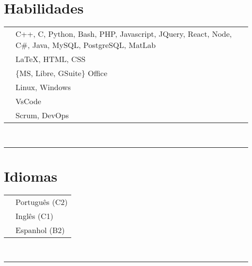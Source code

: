 \documentclass[oneside]{article}
\begin{document}
{\begin{minipage}[t][\textheight-2\fboxsep-2\fboxrule][t]{\dimexpr0.40\textwidth-2\fboxrule-2\fboxsep\relax}
        \section*{\large Habilidades}
        \begin{tabularx}{\textwidth}{cY}
            \faCode{}        & C++, C, Python, Bash, PHP, Javascript, JQuery, React, Node, C\#, Java, MySQL, PostgreSQL, MatLab \\
            \faPen*{}        & \LaTeX, HTML, CSS \\
            \faFont{}        & \{MS, Libre, GSuite\} Office \\
            \faCogs{}        & Linux, Windows \\
            \faLaptopCode{}  & VsCode \\
            \faToolbox{}     & Scrum, DevOps
        \end{tabularx}
        \vspace{1pt} \\
        \rule{\linewidth}{0.4pt}
        \section*{\large Idiomas}
        \begin{tabular}{cl}
            \faLanguage{} & Português (C2) \\
            \faLanguage{} & Inglês (C1) \\
            \faLanguage{} & Espanhol (B2) 
        \end{tabular}
        \vspace{.3cm}
        \\
        \rule{\linewidth}{0.4pt}
        \\

    \end{minipage}
}
\hfill
\end{document}
